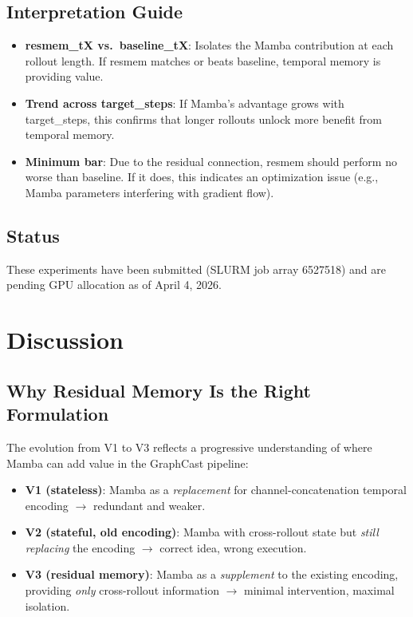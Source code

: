\documentclass[11pt,a4paper]{article}
\begin{document}
\subsection{Interpretation Guide}

\begin{itemize}[nosep]
    \item \textbf{resmem\_tX vs.\ baseline\_tX}: Isolates the Mamba contribution at each rollout length. If resmem matches or beats baseline, temporal memory is providing value.
    \item \textbf{Trend across target\_steps}: If Mamba's advantage grows with target\_steps, this confirms that longer rollouts unlock more benefit from temporal memory.
    \item \textbf{Minimum bar}: Due to the residual connection, resmem should perform no worse than baseline. If it does, this indicates an optimization issue (e.g., Mamba parameters interfering with gradient flow).
\end{itemize}

\subsection{Status}

These experiments have been submitted (SLURM job array 6527518) and are pending GPU allocation as of April 4, 2026.

\section{Discussion}

\subsection{Why Residual Memory Is the Right Formulation}

The evolution from V1 to V3 reflects a progressive understanding of where Mamba can add value in the GraphCast pipeline:

\begin{itemize}
    \item \textbf{V1 (stateless)}: Mamba as a \emph{replacement} for channel-concatenation temporal encoding $\rightarrow$ redundant and weaker.
    \item \textbf{V2 (stateful, old encoding)}: Mamba with cross-rollout state but \emph{still replacing} the encoding $\rightarrow$ correct idea, wrong execution.
    \item \textbf{V3 (residual memory)}: Mamba as a \emph{supplement} to the existing encoding, providing \emph{only} cross-rollout information $\rightarrow$ minimal intervention, maximal isolation.
\end{itemize}
\end{document}
